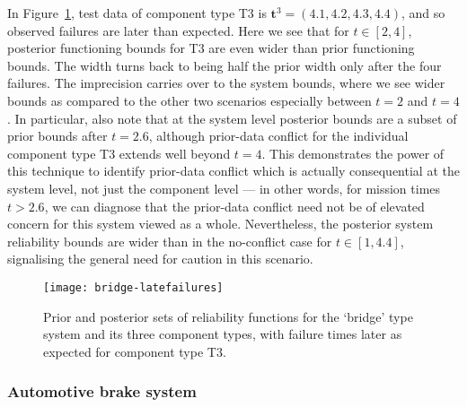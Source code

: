 \documentclass[12pt, a4paper]{elsarticle}
\newcommand{\bs}[1]{\boldsymbol{#1}}
\renewcommand{\vec}[1]{{\bs#1}}
\begin{document}
In Figure~\ref{fig:bridge-late}, 
test data of component type T3 is $\vec{t}^3 = (4.1, 4.2, 4.3, 4.4)$,
and so observed failures are later than expected.
Here we see that for $t \in [2,4]$,
posterior functioning bounds for T3 are even wider than prior functioning bounds.
The width turns back to being half the prior width
only after the four failures.
The imprecision carries over to the system bounds,
where we see wider bounds as compared to the other two scenarios
especially between $t=2$ and $t=4$. In particular, also note
that at the system level posterior bounds are a subset of prior bounds after
$t = 2.6$, although prior-data conflict for the 
individual component type T3 extends well beyond $t=4$.  This 
demonstrates the power of this technique to identify prior-data conflict
which is actually consequential at the system 
level, not just the component level --- in other words, for 
mission times $t>2.6$, we can diagnose that the prior-data conflict 
need not be of elevated concern for this system viewed as a whole.
Nevertheless, the posterior system reliability bounds are wider than in the no-conflict case for $t \in [1, 4.4]$,
signalising the general need for caution in this scenario.

\begin{figure}
\texttt{[image: bridge-latefailures]}
\caption{Prior and posterior sets of reliability functions for the `bridge' type system and its three component types,
with failure times later as expected for component type T3.}
\label{fig:bridge-late}
\end{figure}

\subsubsection{Automotive brake system}
\label{sec:brakeex}
\end{document}

